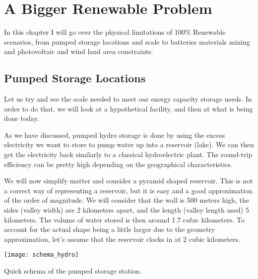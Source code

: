 \setchapterpreamble[u]{\margintoc}
\chapter{A Bigger Renewable Problem}

In this chapter I will go over the physical limitations of 100\% Renewable scenarios, from pumped storage locations and scale to batteries materials mining and photovoltaic and wind land area constraints.

\section{Pumped Storage Locations}

Let us try and see the scale needed to meet our energy capacity storage needs. In order to do that, we will look at a hypothetical facility, and then at what is being done today.

As we have discussed, pumped hydro storage is done by using the excess electricity we want to store to pump water up into a reservoir (lake). We can then get the electricity back similarly to a classical hydroelectric plant. The round-trip efficiency can be pretty high depending on the geographical characteristics.

We will now simplify matter and consider a pyramid shaped reservoir. This is not a correct way of representing a reservoir, but it is easy and a good approximation of the order of magnitude. We will consider that the wall is 500 meters high, the sides (valley width) are 2 kilometers apart, and the length (valley length used) 5 kilometers. The volume of water stored is then around 1.7 cubic kilometers. To account for the actual shape being a little larger due to the geometry approximation, let's assume that the reservoir clocks in at 2 cubic kilometers.

\begin{marginfigure}[-2mm]
	\texttt{[image: schema\_hydro]}
	\caption[Quick schema of the pumped storage station]{Quick schema of the pumped storage station.}
\end{marginfigure}


